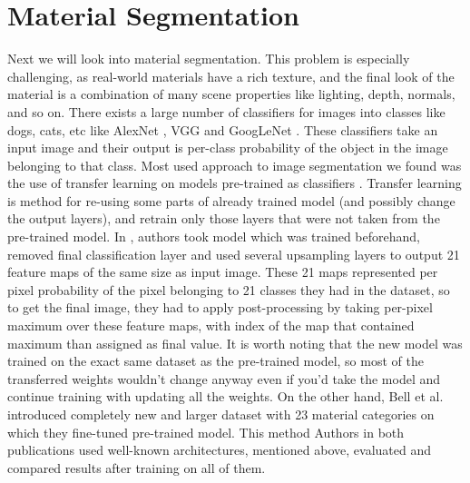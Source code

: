 \section{Material Segmentation}
Next we will look into material segmentation. This problem is especially challenging, as real-world materials have a rich texture, and the final look of the material is a combination of many scene properties like lighting, depth, normals, and so on.
\newline
There exists a large number of classifiers for images into classes like dogs, cats, etc like AlexNet \cite{alexnet}, VGG \cite{vgg} and GoogLeNet \cite{googlenet}. These classifiers take an input image and their output is per-class probability of the object in the image belonging to that class. Most used approach to image segmentation we found was the use of transfer learning on models pre-trained as classifiers \cite{fcn} \cite{material-recognition}. Transfer learning is method for re-using some parts of already trained model (and possibly change the output layers), and retrain only those layers that were not taken from the pre-trained model.
\newline
In \cite{fcn}, authors took model which was trained beforehand, removed final classification layer and used several upsampling layers to output 21 feature maps of the same size as input image. These 21 maps represented per pixel probability of the pixel belonging to 21 classes they had in the dataset, so to get the final image, they had to apply post-processing by taking per-pixel maximum over these feature maps, with index of the map that contained maximum than assigned as final value. It is worth noting that the new model was trained on the exact same dataset as the pre-trained model, so most of the transferred weights wouldn't change anyway even if you'd take the model and continue training with updating all the weights.
\newline
On the other hand, Bell et al. \cite{material-recognition} introduced completely new and larger dataset with 23 material categories on which they fine-tuned pre-trained model. This method 
\newline
Authors in both publications used well-known architectures, mentioned above, evaluated and compared results after training on all of them.